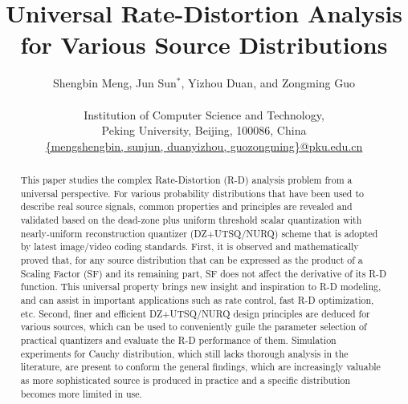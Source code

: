 \documentclass[smallabstract,smallcaptions]{dccpaper}
\begin{document}
\title
{\large
\textbf{Universal Rate-Distortion Analysis for Various Source Distributions}
}

\author{%
Shengbin Meng, Jun Sun$^{\ast}$, Yizhou Duan, and Zongming Guo\\[0.5em]
{\small\begin{minipage}{\linewidth}\begin{center}
\begin{tabular}{ccc}
Institution of Computer Science and Technology, \\
Peking University, Beijing, 100086, China\\
\url{{mengshengbin, sunjun, duanyizhou, guozongming}@pku.edu.cn}
\end{tabular}
\end{center}\end{minipage}}
}

\maketitle
\thispagestyle{empty}

\begin{abstract}
This paper studies the complex Rate-Distortion (R-D) analysis problem from a universal perspective. For various probability distributions that have been used to describe real source signals, common properties and principles are revealed and validated based on the dead-zone plus uniform threshold scalar quantization with nearly-uniform reconstruction quantizer (DZ+UTSQ/NURQ) scheme that is adopted by latest image/video coding standards. First, it is observed and mathematically proved that, for any source distribution that can be expressed as the product of a Scaling Factor (SF) and its remaining part, SF does not affect the derivative of its R-D function. This universal property brings new insight and inspiration to R-D modeling, and can assist in important applications such as rate control, fast R-D optimization, etc. Second, finer and efficient DZ+UTSQ/NURQ design principles are deduced for various sources, which can be used to conveniently guile the parameter selection of practical quantizers and evaluate the R-D performance of them. Simulation experiments for Cauchy distribution, which still lacks thorough analysis in the literature, are present to conform the general findings, which are increasingly valuable as more sophisticated source is produced in practice and a specific distribution becomes more limited in use.
\end{abstract}
\end{document}
